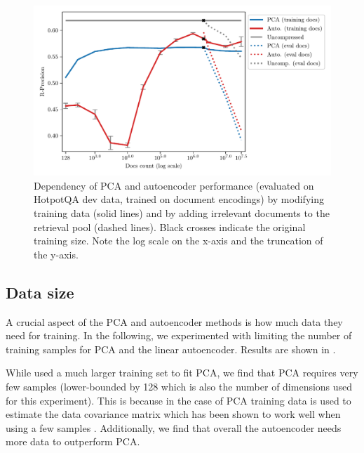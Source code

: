 \begin{figure}[ht]
    \center
    \includegraphics[width=\linewidth]{img/model_data.pdf}

    \captionsetup{type=figure}\caption{Dependency of PCA and autoencoder performance (evaluated on HotpotQA dev data, trained on document encodings) by modifying training data (solid lines) and by adding irrelevant documents to the retrieval pool (dashed lines). Black crosses indicate the original training size. Note the log scale on the x-axis and the truncation of the y-axis.
    }
    \label{fig:model_data}
\end{figure}



\subsection{Data size}

A crucial aspect of the PCA and autoencoder methods is how much data they need for training.
In the following, we experimented with limiting the number of training samples for PCA and the linear autoencoder.
Results are shown in .


While \citet{ma2021simple} used a much larger training set to fit PCA, we find that PCA requires very few samples (lower-bounded by 128 which is also the number of dimensions used for this experiment).
This is because in the case of PCA training data is used to estimate the data covariance matrix which has been shown to work well when using a few samples \citep{tadjudin1999covariance}.
Additionally, we find that overall the autoencoder needs more data to outperform PCA.

